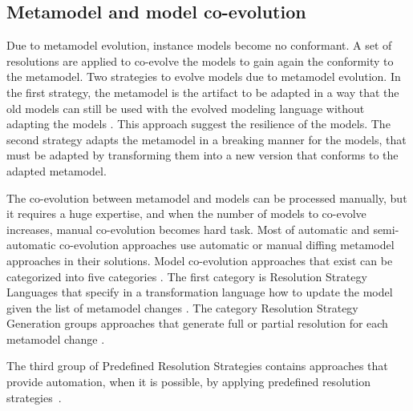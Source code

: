 \subsection{Metamodel and model co-evolution}
Due to metamodel evolution, instance models become no conformant. A set of resolutions are applied to co-evolve the models to gain again the conformity to the metamodel.
Two strategies to evolve models due to metamodel evolution. 
In the first strategy, the metamodel is the artifact to be adapted in a way that the old models can still be used with the evolved modeling language without adapting the models \cite{herrmannsdoerfer2009cope}. This approach suggest the resilience of the models. The second strategy adapts the metamodel in a breaking manner for the models, that must be adapted by transforming them into a new version that conforms to the adapted metamodel.

 The co-evolution between metamodel and models can be processed manually, but it requires a huge expertise, and when the number of models to co-evolve increases, manual co-evolution becomes hard task. 
 Most of automatic and semi-automatic co-evolution approaches use automatic or manual diffing metamodel approaches in their solutions. Model co-evolution approaches that exist can be categorized into five categories \cite{Hebig2017}. The first category is Resolution Strategy Languages that specify in a transformation language how to update the model given the list of metamodel changes \cite{10.1007/978-3-540-87875-9_44,sprinkle2004domain,wimmer2010using,10.1007/978-3-642-30476-7_13,10.1007/978-3-642-38883-5_10,10.1007/s10270-012-0313-5,10.1007/s10270-012-0296-2}. The category Resolution Strategy Generation groups approaches that generate full or partial resolution for each metamodel change \cite{del2007semi,de2008generating,garces2009managing,meyers2011generic,anguel2014using}.
 
 
 The third group of Predefined Resolution Strategies contains approaches that provide automation, when it is possible, by applying predefined resolution strategies \cite{hossler2005coevolution,florez2012coevolution,fernandez2013adapting,wachsmuth2007metamodel,cicchetti2009managing,van2011generic,becker2007process,herrmannsdoerfer2009operation,wittern2013determining}. 
 
